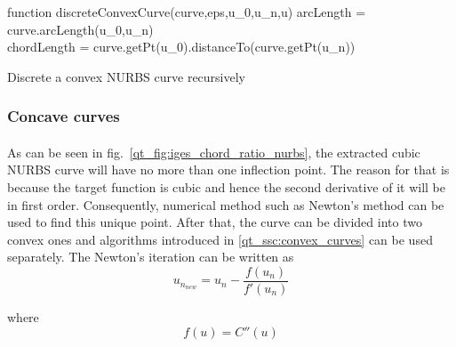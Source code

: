 \begin{algorithm}
    function discreteConvexCurve(curve,eps,u\_0,u\_n,u)
    arcLength = curve.arcLength(u\_0,u\_n) \\
    chordLength = curve.getPt(u\_0).distanceTo(curve.getPt(u\_n)) \\
    
    
\caption{Discrete a convex NURBS curve recursively}
\label{qdt_alg:discrete_convex_nurbs}
\end{algorithm}
\subsubsection{Concave curves}
\paragraph{}
As can be seen in fig.~\ref{qt_fig:iges_chord_ratio_nurbs}, the extracted cubic NURBS curve will have no more than one inflection point.
The reason for that is because the target function is cubic and hence the second derivative of it will be in first order.
Consequently, numerical method such as Newton's method can be used to find this unique point.
After that, the curve can be divided into two convex ones and algorithms introduced in \ref{qt_ssc:convex_curves} can be used separately.
The Newton's iteration can be written as
    \begin{equation}
        u_{n_{new}} = u_n - \frac{f(u_n)}{f'(u_n)}
    \end{equation}

where
    \begin{equation}
        f(u) = C''(u)
    \end{equation}

